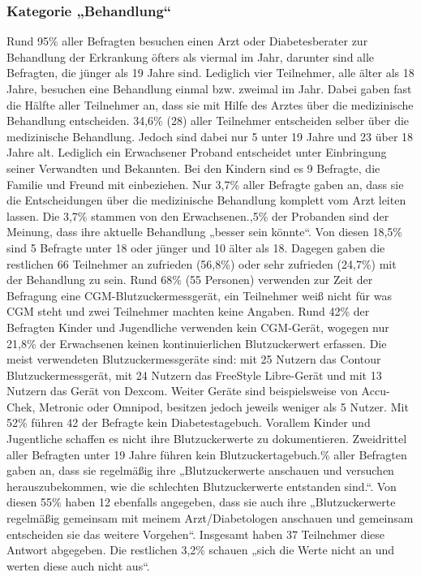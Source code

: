 \documentclass[a4paper,11pt]{article}%
\renewcommand{\\}{\vspace*{0.5\baselineskip} \newline}
\begin{document}
	\subsubsection{Kategorie „Behandlung“}
	Rund 95\% aller Befragten besuchen einen Arzt oder Diabetesberater zur Behandlung der Erkrankung öfters als viermal im Jahr, darunter sind alle Befragten, die jünger als 19 Jahre sind. Lediglich vier Teilnehmer, alle älter als 18 Jahre, besuchen eine Behandlung einmal bzw. zweimal im Jahr. \newline
	Dabei gaben fast die Hälfte aller Teilnehmer an, dass sie mit Hilfe des Arztes über die medizinische Behandlung entscheiden. 34,6\% (28) aller Teilnehmer entscheiden selber über die medizinische Behandlung. Jedoch sind dabei nur 5 unter 19 Jahre und 23 über 18 Jahre alt. Lediglich ein Erwachsener Proband entscheidet unter Einbringung seiner Verwandten und Bekannten. Bei den Kindern sind es 9 Befragte, die Familie und Freund mit einbeziehen.\newline
	Nur 3,7\% aller Befragte gaben an, dass sie die Entscheidungen über die medizinische Behandlung komplett vom Arzt leiten lassen. Die 3,7\% stammen von den Erwachsenen.,5\% der Probanden sind der Meinung, dass ihre aktuelle Behandlung „besser sein könnte“. Von diesen 18,5\% sind 5 Befragte unter 18 oder jünger und 10 älter als 18. Dagegen gaben die restlichen 66 Teilnehmer an zufrieden (56,8\%) oder sehr zufrieden (24,7\%) mit der Behandlung zu sein.\newline
	Rund 68\% (55 Personen) verwenden zur Zeit der Befragung eine CGM-Blutzuckermessgerät, ein Teilnehmer weiß nicht für was CGM steht und zwei Teilnehmer machten keine Angaben. Rund 42\% der Befragten Kinder und Jugendliche verwenden kein CGM-Gerät, wogegen nur 21,8\% der Erwachsenen keinen kontinuierlichen Blutzuckerwert erfassen.\newline
	Die meist verwendeten Blutzuckermessgeräte sind: mit 25 Nutzern das Contour Blutzuckermessgerät, mit 24 Nutzern das FreeStyle Libre-Gerät und mit 13 Nutzern das Gerät von Dexcom. Weiter Geräte sind beispielsweise von Accu-Chek, Metronic oder Omnipod, besitzen jedoch jeweils weniger als 5 Nutzer.\newline
	Mit 52\% führen 42 der Befragte kein Diabetestagebuch. Vorallem Kinder und Jugentliche schaffen es nicht ihre Blutzuckerwerte zu dokumentieren. Zweidrittel aller Befragten unter 19 Jahre führen kein Blutzuckertagebuch.\% aller Befragten gaben an, dass sie regelmäßig ihre „Blutzuckerwerte anschauen und versuchen herauszubekommen, wie die schlechten Blutzuckerwerte entstanden sind.“. Von diesen 55\% haben 12 ebenfalls angegeben, dass sie auch ihre „Blutzuckerwerte regelmäßig gemeinsam mit meinem Arzt/Diabetologen anschauen und gemeinsam entscheiden sie das weitere Vorgehen“. Insgesamt haben 37 Teilnehmer diese Antwort abgegeben. Die restlichen 3,2\% schauen „sich die Werte nicht an und werten diese auch nicht aus“. \newline
\end{document}

